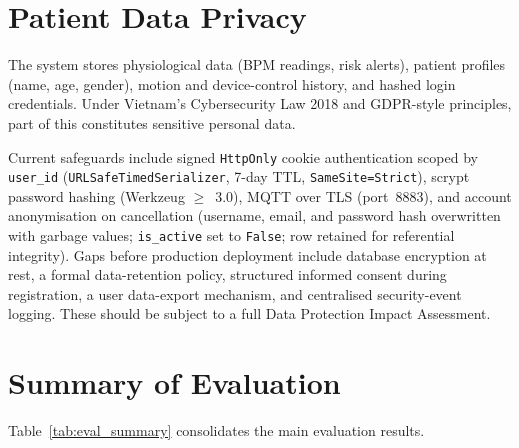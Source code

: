 \section{Patient Data Privacy}
\label{sec:privacy}

The system stores physiological data (BPM readings, risk alerts), patient
profiles (name, age, gender), motion and device-control history, and hashed
login credentials. Under Vietnam's Cybersecurity Law 2018 and GDPR-style
principles, part of this constitutes sensitive personal data.

Current safeguards include signed \texttt{HttpOnly} cookie authentication scoped by \texttt{user\_id} (\texttt{URLSafeTimedSerializer}, 7-day TTL, \texttt{SameSite=Strict}), scrypt password hashing (Werkzeug $\geq$~3.0), MQTT over TLS (port~8883), and account anonymisation on cancellation (username, email, and password hash overwritten with garbage values; \texttt{is\_active} set to \texttt{False}; row retained for referential integrity). Gaps before production deployment include database encryption at rest, a formal data-retention policy, structured informed consent during registration, a user data-export mechanism, and centralised security-event logging. These should be subject to a full Data Protection Impact Assessment.
\section{Summary of Evaluation}
\label{sec:eval_summary}

Table~\ref{tab:eval_summary} consolidates the main evaluation results.

